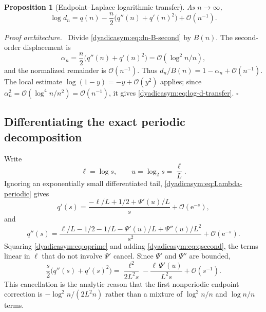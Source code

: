 \documentclass[11pt,oneside]{article}
\newtheorem{proposition}[theorem]{Proposition}
\theoremstyle{definition}
\theoremstyle{remark}
\newcommand{\e}{\mathrm e}
\newcommand{\bigO}{\mathcal O}
\newenvironment{proofidea}{\par\smallskip\noindent\textit{Proof architecture.}\ }{\hfill$\square$\par\smallskip}
\begin{document}
\begin{proposition}[Endpoint--Laplace logarithmic transfer]
\label{dyadicasym:prop:endpoint-laplace-transfer}
As $n\to\infty$,
\begin{equation}
 \boxed{
 \log d_n=q(n)-\frac n2\bigl(q''(n)+q'(n)^2\bigr)
 +\bigO(n^{-1}).}                                          \label{dyadicasym:eq:log-d-transfer}
\end{equation}
\end{proposition}

\begin{proofidea}
Divide \eqref{dyadicasym:eq:dn-B-second} by $B(n)$.  The second-order displacement is
\begin{equation*}
 \alpha_n=\frac n2\bigl(q''(n)+q'(n)^2\bigr)
          =\bigO(\log^2n/n),
\end{equation*}
and the normalized remainder is $\bigO(n^{-1})$.  Thus
$d_n/B(n)=1-\alpha_n+\bigO(n^{-1})$.  The local estimate
$\log(1-y)=-y+\bigO(y^2)$ applies; since
$\alpha_n^2=\bigO(\log^4n/n^2)=\bigO(n^{-1})$, it gives
\eqref{dyadicasym:eq:log-d-transfer}.
\end{proofidea}

\subsection{Differentiating the exact periodic decomposition}

Write
\begin{equation}
 \ell=\log s,
 \qquad
 u=\log_2s=\frac\ell L.                                    \label{dyadicasym:eq:ell-u}
\end{equation}
Ignoring an exponentially small differentiated tail, \eqref{dyadicasym:eq:Lambda-periodic} gives
\begin{equation}
 q'(s)=\frac{-\ell/L+1/2+\Psi'(u)/L}{s}+\bigO(\e^{-s}),     \label{dyadicasym:eq:qprime}
\end{equation}
and
\begin{equation}
 q''(s)=\frac{\ell/L-1/2-1/L-\Psi'(u)/L+\Psi''(u)/L^2}{s^2}
 +\bigO(\e^{-s}).                                           \label{dyadicasym:eq:qsecond}
\end{equation}
Squaring \eqref{dyadicasym:eq:qprime} and adding \eqref{dyadicasym:eq:qsecond}, the terms linear in $\ell$ that do
not involve $\Psi'$ cancel.  Since $\Psi'$ and $\Psi''$ are bounded,
\begin{equation}
 \frac s2\bigl(q''(s)+q'(s)^2\bigr)
 =\frac{\ell^2}{2L^2s}-
   \frac{\ell\,\Psi'(u)}{L^2s}+\bigO(s^{-1}).              \label{dyadicasym:eq:cumulant-expansion}
\end{equation}
This cancellation is the analytic reason that the first nonperiodic endpoint correction is
$-\log^2n/(2L^2n)$ rather than a mixture of $\log^2n/n$ and $\log n/n$ terms.
\end{document}

